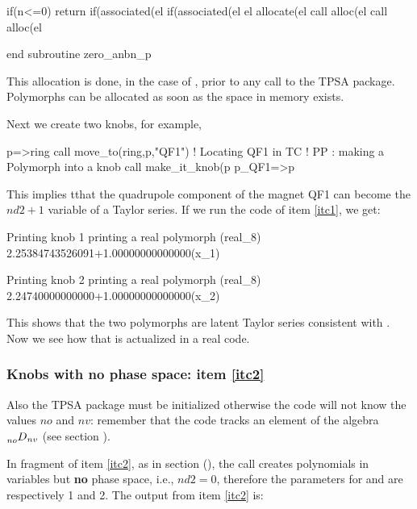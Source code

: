 \documentclass{hitec}     %
\begin{document}
{\begin{code}
    if(n<=0) return
    if(associated(el%
    if(associated(el%
    el%
    allocate(el%
    call alloc(el%
    call alloc(el%

  end subroutine zero_anbn_p
\end{code}

This allocation is done, in the case of , prior to any call to the TPSA package. Polymorphs can be allocated as soon as the space in memory exists.

Next we create two knobs, for example,

\begin{code}
p=>ring%
call move_to(ring,p,"QF1")   !  Locating QF1 in TC
!  PP : making a Polymorph into a knob
call make_it_knob(p%
p_QF1=>p
\end{code}

This implies tthat the quadrupole component  of the magnet QF1 can become the $nd2+1$ variable of a Taylor series. If we run the code of item \ref{itc1}, we get:

\begin{code}
 Printing knob 1
  printing a real polymorph (real_8)
2.25384743526091+1.00000000000000(x_1)

 Printing knob 2
  printing a real polymorph (real_8)
2.24740000000000+1.00000000000000(x_2)
\end{code}

This shows that the two polymorphs are latent Taylor series consistent with . Now we see how that is actualized in a real code.

\subsubsection{Knobs with no phase space: item \ref{itc2}}
\label{s:initigno}


 Also the TPSA package must be initialized otherwise the code will not know the values $no$ and  $nv$: remember that the code tracks an element of the algebra $\prescript{}{no}{D}_{nv}$ (see section ).

In fragment of item \ref{itc2},  as in section (), the call  creates polynomials in  variables but {\bf no} phase space, i.e., $nd2=0$, therefore the parameters for  and  are respectively 1 and 2.  The output from item \ref{itc2} is:

}
\end{document}
